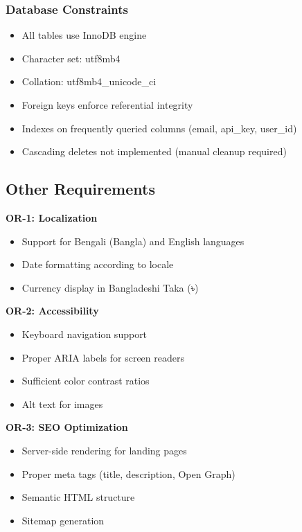 \documentclass[12pt,a4paper]{article}
\begin{document}
\subsubsection{Database Constraints}

\begin{itemize}
    \item All tables use InnoDB engine
    \item Character set: utf8mb4
    \item Collation: utf8mb4\_unicode\_ci
    \item Foreign keys enforce referential integrity
    \item Indexes on frequently queried columns (email, api\_key, user\_id)
    \item Cascading deletes not implemented (manual cleanup required)
\end{itemize}

\subsection{Other Requirements}

\textbf{OR-1: Localization}
\begin{itemize}
    \item Support for Bengali (Bangla) and English languages
    \item Date formatting according to locale
    \item Currency display in Bangladeshi Taka (৳)
\end{itemize}

\textbf{OR-2: Accessibility}
\begin{itemize}
    \item Keyboard navigation support
    \item Proper ARIA labels for screen readers
    \item Sufficient color contrast ratios
    \item Alt text for images
\end{itemize}

\textbf{OR-3: SEO Optimization}
\begin{itemize}
    \item Server-side rendering for landing pages
    \item Proper meta tags (title, description, Open Graph)
    \item Semantic HTML structure
    \item Sitemap generation
\end{itemize}
\end{document}
